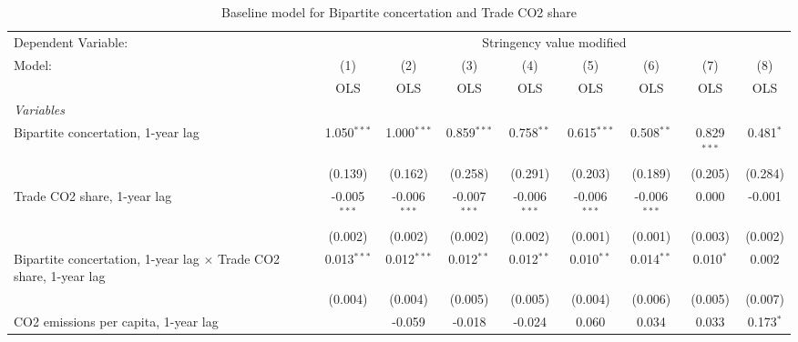 
\begin{table}[htbp]
   \caption{Baseline model for Bipartite concertation and Trade CO2 share}
   \centering
   \begin{tabular}{lcccccccc}
      \toprule
      Dependent Variable: & \multicolumn{8}{c}{Stringency value modified}\\
      Model:                                                                   & (1)            & (2)            & (3)            & (4)            & (5)            & (6)            & (7)           & (8)\\  
                                                                               &  OLS           & OLS            & OLS            & OLS            & OLS            & OLS            & OLS           & OLS\\  
      \midrule
      \emph{Variables}\\
      Bipartite concertation, 1-year lag                                       & 1.050$^{***}$  & 1.000$^{***}$  & 0.859$^{***}$  & 0.758$^{**}$   & 0.615$^{***}$  & 0.508$^{**}$   & 0.829$^{***}$ & 0.481$^{*}$\\   
                                                                               & (0.139)        & (0.162)        & (0.258)        & (0.291)        & (0.203)        & (0.189)        & (0.205)       & (0.284)\\   
      Trade CO2 share, 1-year lag                                              & -0.005$^{***}$ & -0.006$^{***}$ & -0.007$^{***}$ & -0.006$^{***}$ & -0.006$^{***}$ & -0.006$^{***}$ & 0.000         & -0.001\\   
                                                                               & (0.002)        & (0.002)        & (0.002)        & (0.002)        & (0.001)        & (0.001)        & (0.003)       & (0.002)\\   
      Bipartite concertation, 1-year lag $\times$ Trade CO2 share, 1-year lag  & 0.013$^{***}$  & 0.012$^{***}$  & 0.012$^{**}$   & 0.012$^{**}$   & 0.010$^{**}$   & 0.014$^{**}$   & 0.010$^{*}$   & 0.002\\   
                                                                               & (0.004)        & (0.004)        & (0.005)        & (0.005)        & (0.004)        & (0.006)        & (0.005)       & (0.007)\\   
      CO2 emissions per capita, 1-year lag                                     &                & -0.059         & -0.018         & -0.024         & 0.060          & 0.034          & 0.033         & 0.173$^{*}$\\   

\end{tabular}
\end{table}
